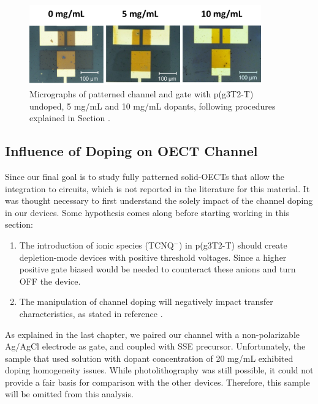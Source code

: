 \begin{figure}[ht]
  \centering
  \includegraphics[width=10cm]{Images/pdf/BigGateDevices.pdf}
  \caption[Micrographs of a patterned channel and gate p(g3T2-T) at different doping levels]{Micrographs of patterned channel and gate with p(g3T2-T) undoped, 5 mg/mL and 10 mg/mL dopants, following procedures explained in Section \label{subsec:photo}.}
  \label{fig:channel}
\end{figure}


\subsection{Influence of Doping on OECT Channel}
Since our final goal is to study fully patterned solid-OECTs that allow the integration to circuits, which is not reported in the literature for this material. It was thought necessary to first understand the solely impact of the channel doping in our devices. Some hypothesis comes along before starting working in this section:

\begin{enumerate}
\item The introduction of ionic species (TCNQ$^{-}$) in p(g3T2-T) should create depletion-mode devices with positive threshold voltages. Since a higher positive gate biased would be needed to counteract these anions and turn OFF the device.
\item The manipulation of channel doping will negatively impact transfer characteristics, as stated in reference \cite{tanTuningOrganicElectrochemical2022}.
\end{enumerate}

As explained in the last chapter, we paired our channel with a non-polarizable Ag/AgCl electrode as gate, and coupled with SSE precursor. Unfortunately, the sample that used solution with dopant concentration of 20 mg/mL exhibited doping homogeneity issues. While photolithography was still possible, it could not provide a fair basis for comparison with the other devices. Therefore, this sample will be omitted from this analysis.

